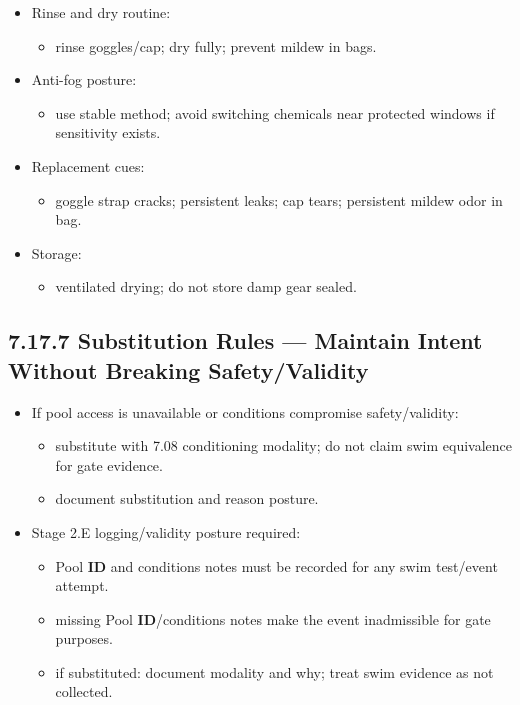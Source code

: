 \documentclass[10pt]{article}
\begin{document}
\begin{itemize}
\item Rinse and dry routine:
  \begin{itemize}
  \item rinse goggles/cap; dry fully; prevent mildew in bags.
  \end{itemize}
\item Anti-fog posture:
  \begin{itemize}
  \item use stable method; avoid switching chemicals near protected windows if sensitivity exists.
  \end{itemize}
\item Replacement cues:
  \begin{itemize}
  \item goggle strap cracks; persistent leaks; cap tears; persistent mildew odor in bag.
  \end{itemize}
\item Storage:
  \begin{itemize}
  \item ventilated drying; do not store damp gear sealed.
  \end{itemize}
\end{itemize}

\subsection*{7.17.7 Substitution Rules — Maintain Intent Without Breaking Safety/Validity}
{}

\begin{itemize}
\item If pool access is unavailable or conditions compromise safety/validity:
  \begin{itemize}
  \item substitute with 7.08 conditioning modality; do not claim swim equivalence for gate evidence.
  \item document substitution and reason posture.
  \end{itemize}
\item Stage 2.E logging/validity posture required:
  \begin{itemize}
  \item Pool \textbf{ID} and conditions notes must be recorded for any swim test/event attempt.
  \item missing Pool \textbf{ID}/conditions notes make the event inadmissible for gate purposes.
  \item if substituted: document modality and why; treat swim evidence as not collected.
  \end{itemize}
\end{itemize}
\end{document}
